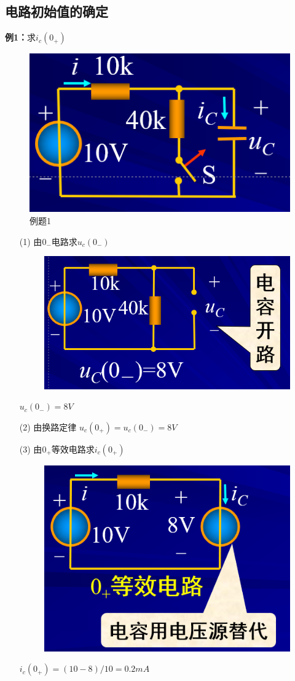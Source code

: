 \documentclass[11pt,a4paper,oneside]{book}
\begin{document}
\subsection{电路初始值的确定}
\noindent\textbf{例1：}求$i_c(0_+)$
\begin{figure}[H]
	\centering
	\includegraphics[width=0.5\linewidth]{screenshot082}
	\caption{例题1}
	\label{fig:screenshot082}
\end{figure}
\begin{enumerate}
	\item[(1)]由$0_-$电路求$u_c(0_-)$
	\begin{figure}[H]
		\centering
		\includegraphics[width=0.5\linewidth]{screenshot083}
		\label{fig:screenshot083}
	\end{figure}
	$u_c(0_-)=8V$
	\item[(2)]由换路定律
	$u_c(0_+)=u_c(0_-)=8V$
	\item[(3)]由$0_+$等效电路求$i_c(0_+)$
	\begin{figure}[H]
		\centering
		\includegraphics[width=0.5\linewidth]{screenshot084}
		\label{fig:screenshot084}
	\end{figure}
	$i_c(0_+)=(10-8)/10=0.2mA$
\end{enumerate}
\end{document}

